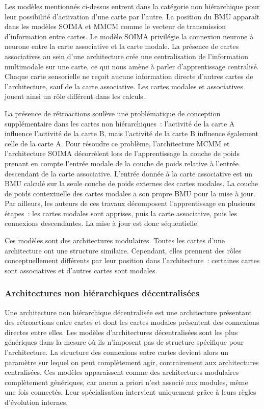 \documentclass[../main]{subfiles}
\begin{document}
Les modèles mentionnés ci-dessus entrent dans la catégorie non hiérarchique pour leur possibilité d'activation d'une carte par l'autre. 
La position du BMU apparaît dans les modèles SOIMA et MMCM comme le vecteur de transmission d'information  entre cartes.
Le modèle SOIMA privilégie la connexion neurone à neurone entre la carte associative et la carte modale.
La présence de cartes associatives au sein d'une architecture crée une centralisation de l'information multimodale sur une carte, ce qui nous amène à parler d'apprentissage centralisé. 
Chaque carte sensorielle ne reçoit aucune information directe d'autres cartes de l'architecture, sauf de la carte associative.
Les cartes modales et associatives jouent ainsi un rôle différent dans les calculs.

La présence de rétroactions soulève une problématique de conception supplémentaire dans les cartes non hiérarchiques~: l'activité de la carte A influence l'activité de la carte B, mais l'activité de la carte B influence également celle de la carte A.
Pour résoudre ce problème, l'architecture MCMM et l'architecture SOIMA décorrèlent lors de l'apprentissage la couche de poids prenant en compte l'entrée modale de la couche de poids relative à l'entrée descendant de la carte associative.
L'entrée donnée à la carte associative est un BMU calculé sur la seule couche de poids externes des cartes modales. La couche de poids contextuelle des cartes modales a son propre BMU pour la mise à jour.
Par ailleurs, les auteurs de ces travaux décomposent l'apprentissage en plusieurs étapes~: les cartes modales sont apprises, puis la carte associative, puis les connexions descendantes. La mise à jour est donc séquentielle.

Ces modèles sont des architectures modulaires. Toutes les cartes d'une architecture ont une structure similaire. Cependant, elles prennent des rôles conceptuellement différents par leur position dans l'architecture~: certaines cartes sont associatives et d'autres cartes sont modales.

\subsubsection{Architectures non hiérarchiques décentralisées}

Une architecture non hiérarchique décentralisée est une architecture présentant des rétroactions entre cartes et dont les cartes modales présentent des connexions directes entre elles.
Les modèles d'architectures décentralisées sont les plus génériques dans la mesure où ils n'imposent pas de structure spécifique pour l'architecture.
La structure des connexions entre cartes devient alors un paramètre sur lequel on peut complètement agir, contrairement aux architectures centralisées. 
Ces modèles apparaissent comme des architectures modulaires complètement génériques, car aucun a priori n'est associé aux modules, même une fois connectés. Leur spécialisation intervient uniquement grâce à leurs règles d'évolution internes.
\end{document}
